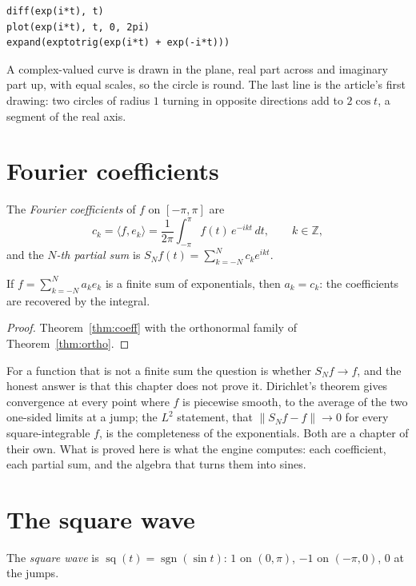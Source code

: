 \begin{trybox}
\begin{verbatim}
diff(exp(i*t), t)
plot(exp(i*t), t, 0, 2pi)
expand(exptotrig(exp(i*t) + exp(-i*t)))
\end{verbatim}
  A complex-valued curve is drawn in the plane, real part across and imaginary part up, with equal
  scales, so the circle is round. The last line is the article's first drawing: two circles of
  radius $1$ turning in opposite directions add to $2\cos t$, a segment of the real axis.
\end{trybox}

\section{Fourier coefficients}

\begin{definition}
  The \emph{Fourier coefficients} of $f$ on $[-\pi, \pi]$ are
  \[
    c_k = \langle f, e_k\rangle = \frac{1}{2\pi}\int_{-\pi}^{\pi} f(t)\,e^{-ikt}\,dt, \qquad k \in
    \mathbb{Z},
  \]
  and the \emph{$N$-th partial sum} is $S_N f(t) = \sum_{k=-N}^{N} c_k e^{ikt}$.
\end{definition}

\begin{theorem}
  If $f = \sum_{k=-N}^{N} a_k e_k$ is a finite sum of exponentials, then $a_k = c_k$: the
  coefficients are recovered by the integral.
\end{theorem}
\begin{proof}
  Theorem~\ref{thm:coeff} with the orthonormal family of Theorem~\ref{thm:ortho}.
\end{proof}

For a function that is not a finite sum the question is whether $S_N f \to f$, and the honest
answer is that this chapter does not prove it. Dirichlet's theorem gives convergence at every point
where $f$ is piecewise smooth, to the average of the two one-sided limits at a jump; the
$L^2$ statement, that $\|S_N f - f\| \to 0$ for every square-integrable $f$, is the completeness
of the exponentials. Both are a chapter of their own. What is proved here is what the engine
computes: each coefficient, each partial sum, and the algebra that turns them into sines.

\section{The square wave}

\begin{definition}
  The \emph{square wave} is $\operatorname{sq}(t) = \operatorname{sgn}(\sin t)$: $1$ on $(0,
  \pi)$, $-1$ on $(-\pi, 0)$, $0$ at the jumps.
\end{definition}


